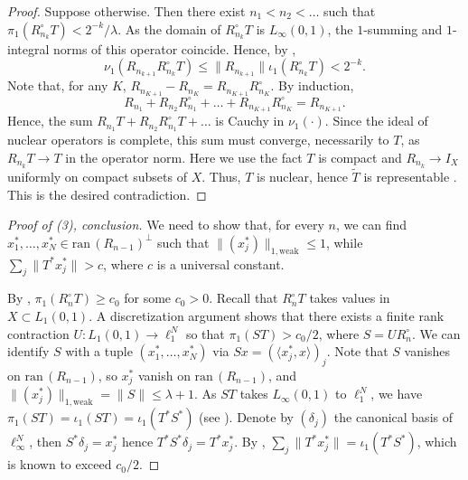 \documentclass{amsart}
\theoremstyle{plain}
\theoremstyle{definition}
\numberwithin{equation}{section}
\newcommand{\ran}{\textrm{ran}\,}
\begin{document}
\begin{proof}
Suppose otherwise. %
Then there exist $n_1 < n_2 < \ldots$ such that $\pi_1(R_{n_k}^\circ T) < 2^{-k}/\lambda$. 
As the domain of $R_{n_k}^\circ T$ is $L_\infty(0,1)$, the $1$-summing and $1$-integral norms of this operator coincide. Hence, by \cite[Proposition 5.27]{DJT},
$$
\nu_1(R_{n_{k+1}} R_{n_k}^\circ T) \leq \|R_{n_{k+1}}\| \iota_1(R_{n_k}^\circ T) < 2^{-k} .
$$
Note that, for any $K$, $R_{n_{K+1}} - R_{n_K} = R_{n_{K+1}} R_{n_K}^\circ$. By induction, 
$$
R_{n_1} + R_{n_2} R_{n_1}^\circ + \ldots + R_{n_{K+1}} R_{n_K}^\circ = R_{n_{K+1}} .
$$
Hence, the sum $R_{n_1} T + R_{n_2} R_{n_1}^\circ T + \ldots$ is Cauchy in $\nu_1( \cdot )$. Since the ideal of nuclear operators is complete, this sum must converge, necessarily to $T$, as $R_{n_k}T \to T$ in the operator norm. Here we use the fact $T$ is compact and $R_{n_k} \to I_X$ uniformly on compact subsets of $X$.
Thus, $T$ is nuclear, hence $\widetilde{T}$ is representable \cite[C3]{DeFl}. This is the desired contradiction.
\end{proof}

\begin{proof}[Proof of (3), conclusion]
We need to show that, for every $n$, we can find $x_1^*, \ldots, x_N^* \in \ran(R_{n-1})^\perp$ such that $\|(x_j^*)\|_{1,{\textrm{weak}}} \leq 1$, while $\sum_j \|T^* x_j^*\| > c$, where $c$ is a universal constant.

By , $\pi_1(R_n^\circ T) \geq c_0$ for some $c_0 > 0$. Recall that $R_n^\circ T$ takes values in $X \subset L_1(0,1)$. A discretization argument shows that there exists a finite rank contraction $U : L_1(0,1) \to \ell_1^N$ so that $\pi_1(S T) > c_0/2$, where $S = U R_n^\circ$. We can identify $S$ with a tuple $(x_1^*, \ldots, x_N^*)$ via $Sx = ( \langle x_j^* , x \rangle )_j$.  Note that $S$ vanishes on $\ran(R_{n-1})$, so $x_j^*$ vanish on $\ran(R_{n-1})$, and $\|(x_j^*)\|_{1,{\textrm{weak}}} = \|S\| \leq \lambda + 1$.
As $ST$ takes $L_\infty(0,1)$ to $\ell_1^N$, we have $\pi_1(ST) = \iota_1(ST) = \iota_1(T^*S^*)$ (see \cite[Chapter 5]{DJT}).
Denote by $(\delta_j)$ the canonical basis of $\ell_\infty^N$, then $S^* \delta_j = x_j^*$ hence $T^* S^* \delta_j = T^* x_j^*$. By , $\sum_j \|T^* x_j^*\| = \iota_1(T^* S^*)$, which is known to exceed $c_0/2$.
\end{proof}
\end{document}

